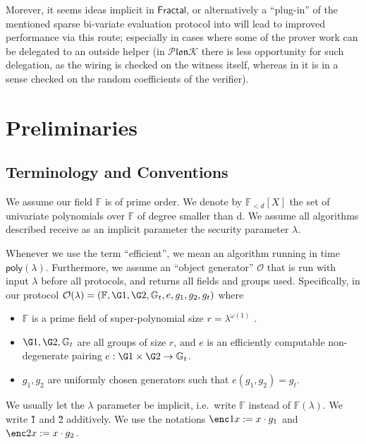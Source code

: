 \documentclass[11pt]{article} %
\newcommand{\plonk}{\ensuremath{\mathcal{P} \mathfrak{lon}\mathcal{K}}\xspace}
\newcommand{\Gt}{\ensuremath{{\mathbb G}_t}\xspace}
\newcommand{\F}{\ensuremath{\mathbb F}\xspace}
\newcommand{\defeq}{:=}
\newcommand{\polysofdeg}[1]{\ensuremath{\F_{< #1}[X]}\xspace}
\newcommand{\obgen}{\ensuremath{\mathcal O}\xspace}
\newcommand{\poly}{\ensuremath{\mathsf{poly(\lambda)}}\xspace}
\newcommand{\fractal}{\ensuremath{\mathsf{Fractal}}\xspace}
\begin{document}
Morever, it seems ideas implicit in \fractal, or alternatively a ``plug-in'' of the mentioned sparse bi-variate evaluation protocol into \cite{auroralight} will lead to improved performance via this route;
especially in cases where some of the prover work can be delegated to an outside helper (in \plonk there is less opportunity for such delegation, as the wiring is checked on the witness itself, whereas in \cite{auroralight,marlin,fractal} it is in a sense checked on the random coefficients of the verifier).

\section{Preliminaries}


\subsection{Terminology and Conventions}\label{sec:terminology}
We assume our field \F is of prime order.
We denote by \polysofdeg{d} the set of univariate polynomials over \F of degree smaller than d. 
We assume all algorithms described receive as an implicit parameter the security parameter $\lambda$.

Whenever we use the term “efficient”, we mean an algorithm running in time \poly. Furthermore,
we assume an “object generator” \obgen that is run with input $\lambda$ before all protocols, and returns all fields and groups used. Specifically, in our protocol $\obgen(\lambda) = (\F, \G1, \G2, \Gt, e, g_1, g_2,g_t)$ where
\begin{itemize}
\item \F is a prime field of super-polynomial size $r = \lambda^{\omega(1)}$
.
\item $\G1,\G2,\Gt$ are all groups of size $r$, and $e$ is an efficiently computable non-degenerate pairing
$e : \G1 \times \G2 \to \Gt$.
\item $g_1,g_2$ are uniformly chosen generators such that $e(g_1, g_2) = g_t$.
\end{itemize}
We usually let the $\lambda$ parameter be implicit, i.e.\ write \F instead of $\F(\lambda)$.
We write \G1 and \G2 additively. We use the notations $\enc1{x}\defeq x\cdot g_1$ and $\enc2{x}\defeq x\cdot g_2$.
\end{document}
